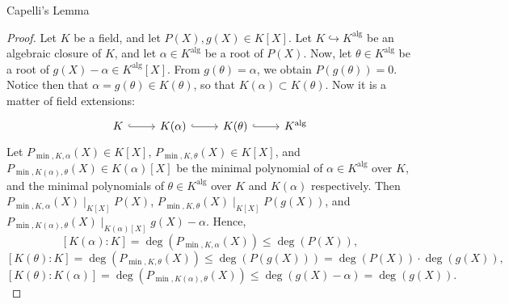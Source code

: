 \begin{appendixitem}{Capelli's Lemma}
    \begin{proof}
        Let \( K \) be a field, and let \( P\left(X\right), g\left(X\right) \in K\left[X\right] \). Let \( K \hookrightarrow K^{\text{alg}} \) be an algebraic closure of \( K \), and let \( \alpha \in K^{\text{alg}} \) be a root of \( P\left(X\right) \). Now, let \( \theta \in K^{\text{alg}} \) be a root of \( g\left(X\right) - \alpha\in K^{\text{alg}}\left[X\right] \). From \( g\left(\theta\right) = \alpha \), we obtain \( P\left( g\left(\theta\right) \right) = 0 \). Notice then that \( \alpha=g\left(\theta\right) \in K\left(\theta\right) \), so that \( K\left(\alpha\right) \subset K\left(\theta\right) \). Now it is a matter of field extensions:
        \[
            \begin{tikzcd}
                K & {K(\alpha)} & {K(\theta)} & {K^{\mathrm{alg}}}
                \arrow[hook, from=1-1, to=1-2]
                \arrow[hook, from=1-2, to=1-3]
                \arrow[hook, from=1-3, to=1-4]
            \end{tikzcd}
        \]
        Let \( P_{\min, K, \alpha}\left(X\right) \in K\left[X\right] \), \( P_{\min, K, \theta}\left(X\right) \in K\left[X\right] \), and \( P_{\min, K\left(\alpha\right), \theta}\left(X\right) \in K\left(\alpha\right)\left[X\right] \) be the minimal polynomial of \( \alpha \in K^{\text{alg}} \) over \( K \), and the minimal polynomials of \( \theta \in K^{\text{alg}} \) over \( K \) and \( K\left(\alpha\right) \) respectively. Then \( P_{\min, K, \alpha}\left(X\right) \mid_{K\left[X\right]} P\left(X\right) \), \( P_{\min, K, \theta}\left(X\right) \mid_{K\left[X\right]} P\left(g\left(X\right)\right) \), and \( P_{\min, K\left(\alpha\right), \theta}\left(X\right) \mid_{K\left(\alpha\right)\left[X\right]} g\left(X\right) - \alpha \). Hence,
        \begin{equation}
            \label{A.1.1} \tag{1} \left[ K\left(\alpha\right) : K \right] = \deg\left( P_{\min, K, \alpha}\left(X\right) \right) \leq \deg\left( P\left(X\right) \right),
        \end{equation}
        \begin{equation}
            \label{A.1.2} \tag{2} \left[ K\left(\theta\right) : K \right] = \deg\left( P_{\min, K, \theta}\left(X\right) \right) \leq \deg\left( P\left( g\left(X\right) \right) \right) = \deg\left( P\left(X\right) \right) \cdot \deg\left( g\left(X\right) \right),
        \end{equation}
        \begin{equation}
            \label{A.1.3} \tag{3} \left[ K\left(\theta\right) : K\left(\alpha\right) \right] = \deg\left( P_{\min, K\left(\alpha\right), \theta}\left(X\right) \right) \leq \deg\left( g\left(X\right) - \alpha \right) = \deg\left( g\left(X\right) \right).

\end{equation}
\end{proof}
\end{appendixitem}
